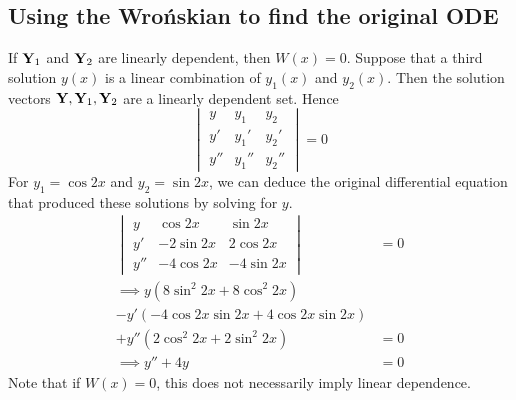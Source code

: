 \subsection{Using the Wro\'nskian to find the original ODE}
If \(\vb Y_1\) and \(\vb Y_2\) are linearly dependent, then \(W(x) = 0\).
Suppose that a third solution \(y(x)\) is a linear combination of \(y_1(x)\) and \(y_2(x)\).
Then the solution vectors \(\vb Y, \vb Y_1, \vb Y_2\) are a linearly dependent set.
Hence
\[
	\begin{vmatrix}
		y   & y_1   & y_2   \\
		y'  & y_1'  & y_2'  \\
		y'' & y_1'' & y_2''
	\end{vmatrix}
	= 0
\]
For \(y_1 = \cos 2x\) and \(y_2 = \sin 2x\), we can deduce the original differential equation that produced these solutions by solving for \(y\).
\begin{align*}
	\begin{vmatrix}
		y   & \cos 2x   & \sin 2x    \\
		y'  & -2\sin 2x & 2 \cos 2x  \\
		y'' & -4\cos 2x & -4 \sin 2x
	\end{vmatrix}
	                                             & = 0 \\
	\implies y(8\sin^2 2x + 8\cos^2 2x)          &     \\
	- y'(-4 \cos 2x \sin 2x + 4 \cos 2x \sin 2x) &     \\
	+ y''(2\cos^2 2x + 2\sin^2 2x)               & = 0 \\
	\implies y'' + 4y                            & = 0
\end{align*}
Note that if \(W(x) = 0\), this does not necessarily imply linear dependence.

